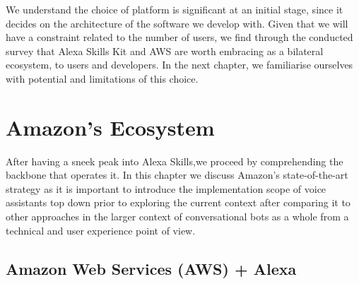 



%
%
%
%


















We understand the choice of platform is significant at an initial stage, since it decides on the architecture of the software we develop with. Given that we will have a constraint related to the number of users, we find through the conducted survey that Alexa Skills Kit and AWS are worth embracing as a bilateral ecosystem, to users and developers. In the next chapter, we familiarise ourselves with potential and limitations of this choice.


\chapter{Amazon's Ecosystem}
\label{amznecosys}

%



After having a sneek peak into Alexa Skills,we proceed by comprehending the backbone that operates it.
In this chapter we discuss Amazon's state-of-the-art strategy
as it is important to introduce the implementation scope of voice assistants 
top down
prior to exploring the current context 
after comparing it to other approaches in the larger context of conversational bots as a whole from a technical and user experience point of view. 


\section[Amazon Web Services + Alexa]{Amazon Web Services (AWS) + Alexa}


